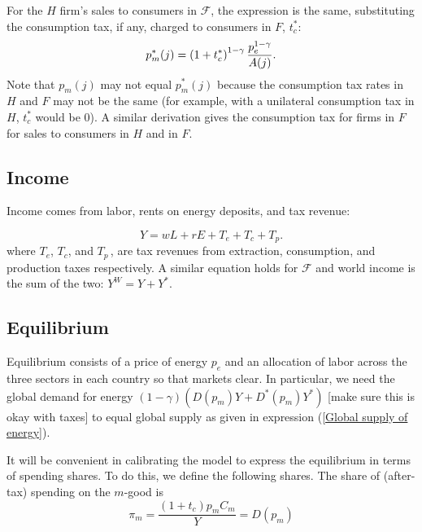 \documentclass[notitlepage,12pt]{article}
\begin{document}
For the $H$ firm's sales to consumers in $\mathcal{F}$, the expression is
the same, substituting the consumption tax, if any, charged to consumers in $%
F$, $t_{c}^{\ast }$:%
\begin{equation*}
p_{m}^{\ast }(j)=\left( 1+t_{c}^{\ast }\right) ^{1-\gamma }\frac{%
p_{e}^{1-\gamma }}{A(j)}.
\end{equation*}%
Note that $p_{m}\left( j\right) $ may not equal $p_{m}^{\ast }\left(
j\right) $ because the consumption tax rates in $H$ and $F$ may not be the
same (for example, with a unilateral consumption tax in $H$, $t_{c}^{\ast }$
would be $0$). A similar derivation gives the consumption tax for firms in $%
F $ for sales to consumers in $H$ and in $F$.

\subsection{Income}

Income comes from labor, rents on energy deposits, and tax revenue:

\begin{equation*}
Y=wL+rE+T_{e}+T_{c}+T_{p}.
\end{equation*}%
where $T_{e}$, $T_{c}$, and $T_{p}\,$, are tax revenues from extraction,
consumption, and production taxes respectively. A similar equation holds for 
$\mathcal{F}$ and world income is the sum of the two: $Y^{W}=Y+Y^{\ast }$.

\subsection{Equilibrium}

Equilibrium consists of a price of energy $p_{e}$ and an allocation of labor
across the three sectors in each country so that markets clear. In
particular, we need the global demand for energy $\left( 1-\gamma \right)
\left( D\left( p_{m}\right) Y+D^{\ast }\left( p_{m}\right) Y^{\ast }\right) $
[make sure this is okay with taxes] to equal global supply as given in
expression (\ref{Global supply of energy}).

It will be convenient in calibrating the model to express the equilibrium in
terms of spending shares. To do this, we define the following shares. The
share of (after-tax) spending on the $m$-good is%
\begin{equation*}
\pi _{m}=\frac{\left( 1+t_{c}\right) p_{m}C_{m}}{Y}=D\left( p_{m}\right) 
\end{equation*}
\end{document}
